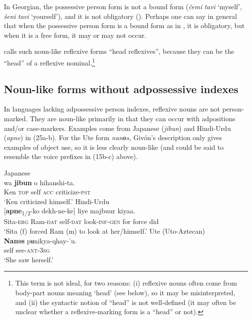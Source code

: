 \documentclass[output=paper]{langscibook}
\begin{document}
In Georgian, the possessive person form is not a bound form (\textit{čemi} \textit{tavi} ‘myself’, \textit{šeni} \textit{tavi} ‘yourself’), and it is not obligatory (\citealt{Amiridze2002}). Perhaps one can say in general that when the possessive person form is a bound form as in , it is obligatory, but when it is a free form, it may or may not occur.

  \citet{Faltz1977} calls such noun-like reflexive forms “head reflexives”, because they can be the “head” of a reflexive nominal.\footnote{ {This term is not ideal, for two reasons: (i) reflexive nouns often come from body-part nouns meaning ‘head’ (see  below), so it may be misinterpreted, and (ii) the syntactic notion of “head” is not well-defined (it may often be unclear whether a reflexive-marking form is a “head” or not).}}

\subsection{Noun-like forms without adpossessive indexes}\label{sec:Haspelmath:6.2}

In languages lacking adpossessive person indexes, reflexive nouns are not person-marked. They are noun-like primarily in that they can occur with adpositions and/or case-markers. Examples come from Japanese (\textit{jibun}) and Hindi-Urdu (\textit{apne}) in (25a-b). For the Ute form \textit{nanɵs,} Givón’s description only gives examples of object use, so it is less clearly noun-like (and could be said to resemble the voice prefixes in (15b-c) above). 

\ea%
    \label{ex:Haspelmath:25}
    \ea Japanese \label{ex:Haspelmath:25a}\\
      {wa}  \textbf{{jibun}}  {o}  {hihanshi-ta.}\\
      Ken  \textsc{top}  self  \textsc{acc}  criticize-\textsc{pst}  \\
    \glt‘Ken criticized himself.’ \citep[380]{Hirose2018}
    \ex Hindi-Urdu \label{ex:Haspelmath:25b}\\
     [\textbf{{apne}}{\textsubscript{1/2}}{{}-ko  dekh-ne-ke}]  {liye}  {majbuur}  {kiyaa.}\\
     Sita-\textsc{erg}  Ram-\textsc{dat}  self-\textsc{dat}  look-\textsc{inf-gen}  for  force  did\\
    \glt  ‘Sita (f) forced Ram (m) to look at her/himself.’ \citep[47]{Davison2001}
     \ex  Ute (Uto-Aztecan) \label{ex:Haspelmath:25c}\\
    \gll \textbf{{Nan}}{ɵ}\textbf{{s}}  {pʉnikya-qhay-ˈu.}\\
     self  see-\textsc{ant}{}-\textsc{3sg}\\
    \glt ‘She saw herself.’ \citep[237]{Givón2011}
    \z
\z 
         
\end{document}
